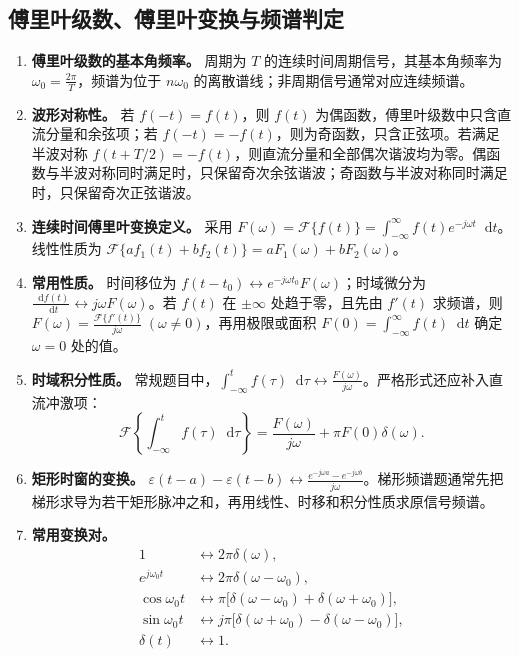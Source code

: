 \documentclass[12pt,a4paper]{ctexart}
\newcommand{\eps}{\varepsilon}
\newcommand{\dif}{\mathop{}\!\mathrm{d}}
\begin{document}
\subsection{傅里叶级数、傅里叶变换与频谱判定}
\begin{enumerate}
\item \textbf{傅里叶级数的基本角频率。} 周期为 $T$ 的连续时间周期信号，其基本角频率为 \(\displaystyle \omega_0=\frac{2\pi}{T}\)，频谱为位于 $n\omega_0$ 的离散谱线；非周期信号通常对应连续频谱。

\item \textbf{波形对称性。} 若 \(\displaystyle f(-t)=f(t)\)，则 $f(t)$ 为偶函数，傅里叶级数中只含直流分量和余弦项；若 \(\displaystyle f(-t)=-f(t)\)，则为奇函数，只含正弦项。若满足半波对称 \(\displaystyle f(t+T/2)=-f(t)\)，则直流分量和全部偶次谐波均为零。偶函数与半波对称同时满足时，只保留奇次余弦谐波；奇函数与半波对称同时满足时，只保留奇次正弦谐波。

\item \textbf{连续时间傅里叶变换定义。} 采用 \(\displaystyle F(\omega)=\mathcal F\{f(t)\}=\int_{-\infty}^{\infty}f(t)e^{-j\omega t}\dif t\)。线性性质为 \(\displaystyle \mathcal F\{af_1(t)+bf_2(t)\}=aF_1(\omega)+bF_2(\omega)\)。

\item \textbf{常用性质。} 时间移位为 \(\displaystyle f(t-t_0)\longleftrightarrow e^{-j\omega t_0}F(\omega)\)；时域微分为 \(\displaystyle \frac{\dif f(t)}{\dif t}\longleftrightarrow j\omega F(\omega)\)。若 $f(t)$ 在 $\pm\infty$ 处趋于零，且先由 $f'(t)$ 求频谱，则 \(\displaystyle F(\omega)=\frac{\mathcal F\{f'(t)\}}{j\omega}\;(\omega\ne0)\)，再用极限或面积 \(\displaystyle F(0)=\int_{-\infty}^{\infty}f(t)\dif t\) 确定 $\omega=0$ 处的值。

\item \textbf{时域积分性质。} 常规题目中，\(\displaystyle \int_{-\infty}^{t}f(\tau)\dif\tau\longleftrightarrow\frac{F(\omega)}{j\omega}\)。严格形式还应补入直流冲激项：\[\mathcal F\left\{\int_{-\infty}^{t}f(\tau)\dif\tau\right\}=\frac{F(\omega)}{j\omega}+\pi F(0)\delta(\omega).\]

\item \textbf{矩形时窗的变换。} \(\displaystyle \eps(t-a)-\eps(t-b)\longleftrightarrow\frac{e^{-j\omega a}-e^{-j\omega b}}{j\omega}\)。梯形频谱题通常先把梯形求导为若干矩形脉冲之和，再用线性、时移和积分性质求原信号频谱。

\item \textbf{常用变换对。} \[\begin{aligned}
1&\longleftrightarrow 2\pi\delta(\omega),\\
e^{j\omega_0t}&\longleftrightarrow2\pi\delta(\omega-\omega_0),\\
\cos\omega_0t&\longleftrightarrow\pi\bigl[\delta(\omega-\omega_0)+\delta(\omega+\omega_0)\bigr],\\
\sin\omega_0t&\longleftrightarrow j\pi\bigl[\delta(\omega+\omega_0)-\delta(\omega-\omega_0)\bigr],\\
\delta(t)&\longleftrightarrow1.
\end{aligned}\]
\end{enumerate}
\end{document}
